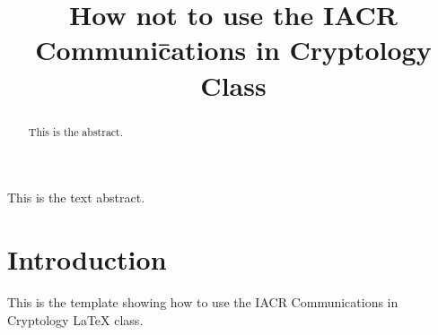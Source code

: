 \documentclass[version=final]{iacrcc}
\title[running  = {The iacrcc class},
       subtitle = {A Template}
      ]{How not to use the IACR Communi\=cations in Cryptology Class}
\begin{document}
\maketitle

\begin{abstract}
This is the abstract.
\end{abstract}
\begin{textabstract}
This is the text abstract.
\end{textabstract}

\section{Introduction}
This is the template showing how to use the IACR Communications in Cryptology \LaTeX{} class. 
\lipsum[1-5]
\end{document}
